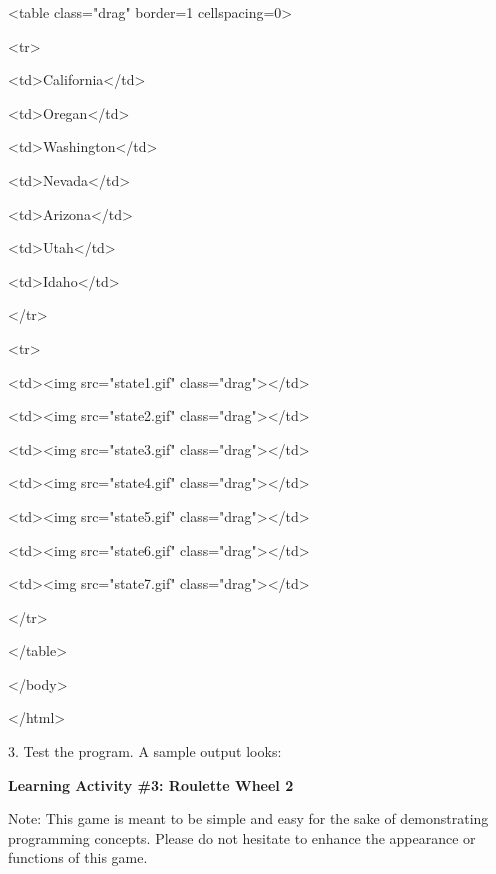 \documentclass[
]{article}
\begin{document}
\textless table class="drag" border=1 cellspacing=0\textgreater{}

\textless tr\textgreater{}

\textless td\textgreater California\textless/td\textgreater{}

\textless td\textgreater Oregan\textless/td\textgreater{}

\textless td\textgreater Washington\textless/td\textgreater{}

\textless td\textgreater Nevada\textless/td\textgreater{}

\textless td\textgreater Arizona\textless/td\textgreater{}

\textless td\textgreater Utah\textless/td\textgreater{}

\textless td\textgreater Idaho\textless/td\textgreater{}

\textless/tr\textgreater{}

\textless tr\textgreater{}

\textless td\textgreater\textless img src="state1.gif"
class="drag"\textgreater\textless/td\textgreater{}

\textless td\textgreater\textless img src="state2.gif"
class="drag"\textgreater\textless/td\textgreater{}

\textless td\textgreater\textless img src="state3.gif"
class="drag"\textgreater\textless/td\textgreater{}

\textless td\textgreater\textless img src="state4.gif"
class="drag"\textgreater\textless/td\textgreater{}

\textless td\textgreater\textless img src="state5.gif"
class="drag"\textgreater\textless/td\textgreater{}

\textless td\textgreater\textless img src="state6.gif"
class="drag"\textgreater\textless/td\textgreater{}

\textless td\textgreater\textless img src="state7.gif"
class="drag"\textgreater\textless/td\textgreater{}

\textless/tr\textgreater{}

\textless/table\textgreater{}

\textless/body\textgreater{}

\textless/html\textgreater{}

3. Test the program. A sample output looks:

\textbf{Learning Activity \#3: Roulette Wheel 2}

Note: This game is meant to be simple and easy for the sake of
demonstrating programming concepts. Please do not hesitate to enhance
the appearance or functions of this game.
\end{document}
